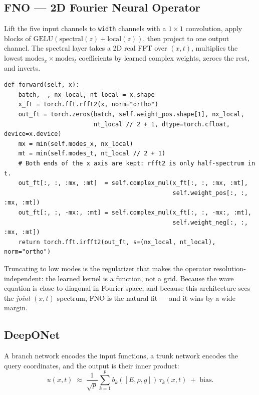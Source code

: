 \documentclass[11pt,a4paper]{article}
\begin{document}
\subsection{FNO --- 2D Fourier Neural Operator}

Lift the five input channels to \texttt{width} channels with a $1\times1$
convolution, apply blocks of $\mathrm{GELU}(\text{spectral}(z)+\text{local}(z))$,
then project to one output channel. The spectral layer takes a 2D real FFT over
$(x,t)$, multiplies the lowest $\text{modes}_x\times\text{modes}_t$ coefficients
by learned complex weights, zeroes the rest, and inverts.

\begin{lstlisting}
def forward(self, x):
    batch, _, nx_local, nt_local = x.shape
    x_ft = torch.fft.rfft2(x, norm="ortho")
    out_ft = torch.zeros(batch, self.weight_pos.shape[1], nx_local,
                         nt_local // 2 + 1, dtype=torch.cfloat, device=x.device)
    mx = min(self.modes_x, nx_local)
    mt = min(self.modes_t, nt_local // 2 + 1)
    # Both ends of the x axis are kept: rfft2 is only half-spectrum in t.
    out_ft[:, :, :mx, :mt]  = self.complex_mul(x_ft[:, :, :mx, :mt],
                                               self.weight_pos[:, :, :mx, :mt])
    out_ft[:, :, -mx:, :mt] = self.complex_mul(x_ft[:, :, -mx:, :mt],
                                               self.weight_neg[:, :, :mx, :mt])
    return torch.fft.irfft2(out_ft, s=(nx_local, nt_local), norm="ortho")
\end{lstlisting}

Truncating to low modes is the regularizer that makes the operator
resolution-independent: the learned kernel is a function, not a grid. Because
the wave equation is close to diagonal in Fourier space, and because this
architecture sees the \emph{joint} $(x,t)$ spectrum, FNO is the natural fit ---
and it wins by a wide margin.

\subsection{DeepONet}

A branch network encodes the input functions, a trunk network encodes the query
coordinates, and the output is their inner product:
\begin{equation}
u(x,t)\;\approx\;\frac{1}{\sqrt{p}}\sum_{k=1}^{p} b_k\!\left([E,\rho,g]\right)\,
\tau_k(x,t) \;+\; \text{bias}.
\end{equation}
\end{document}
